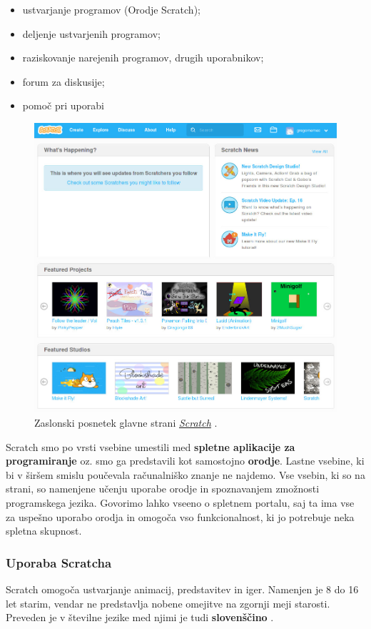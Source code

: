\begin{itemize}
\item ustvarjanje programov (Orodje Scratch);
\item deljenje ustvarjenih programov;
\item raziskovanje narejenih programov, drugih uporabnikov;
\item forum za diskusije;
\item pomoč pri uporabi
\end{itemize}

\begin{figure}[h!]
  \centering
    \includegraphics [width=0.65\linewidth, keepaspectratio =
   1] {./images/sc_web/scratch_mainP-v01.jpg}
   \caption{Zaslonski posnetek glavne strani
     \emph{\href{https://scratch.mit.edu/}{Scratch}}
     \cite{web:scratch}.}
    \label{fig:web:scratch:main}
\end{figure}

Scratch smo po vrsti vsebine umestili med \textbf{spletne aplikacije
  za programiranje} oz. smo ga predstavili kot samostojno
\textbf{orodje}. Lastne vsebine, ki bi v širšem smislu poučevala
računalniško znanje ne najdemo. Vse vsebin, ki so na strani, so
namenjene učenju uporabe orodje in spoznavanjem zmožnosti programskega
jezika. Govorimo lahko vseeno o spletnem portalu, saj ta ima vse za
uspešno uporabo orodja in omogoča vso funkcionalnost, ki jo potrebuje
neka spletna skupnost.

\subsubsection{Uporaba Scratcha}
\label{sec:uporaba_scratcha}

Scratch omogoča ustvarjanje animacij, predstavitev in iger. Namenjen je
8 do 16 let starim, vendar ne predstavlja nobene omejitve na zgornji
meji starosti. Preveden je v številne jezike med njimi je tudi
\textbf{slovenščino} \cite{web:scratch:about}.

